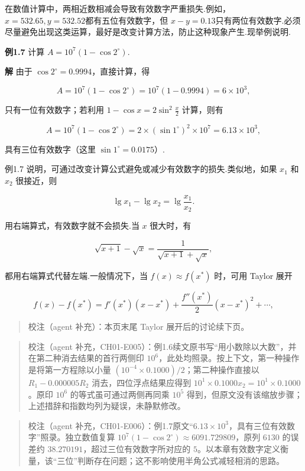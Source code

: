 \documentclass[
  10pt,
  fontset=fandol]{ctexart}
\begin{document}
在数值计算中，两相近数相减会导致有效数字严重损失.例如，\(x=532.65, y=532.52\)都有五位有效数字，但 \(x-y=0.13\)只有两位有效数字.必须尽量避免出现这类运算，最好是改变计算方法，防止这种现象产生.现举例说明.

\textbf{例1.7} 计算 \(A=10^7(1-\cos 2^\circ)\).

\textbf{解} 由于 \(\cos 2^\circ=0.9994\)，直接计算，得

\[
A=10^7(1-\cos 2^\circ)=10^7(1-0.9994)=6 \times 10^3,
\]

只有一位有效数字；若利用 \(1-\cos x=2\sin^2\frac{x}{2}\) 计算，则有

\[
A=10^7(1-\cos 2^\circ)=2 \times (\sin 1^\circ)^2 \times 10^7=6.13 \times 10^3,
\]

具有三位有效数字（这里 \(\sin 1^\circ=0.0175\)）.

例1.7 说明，可通过改变计算公式避免或减少有效数字的损失.类似地，如果 \(x_1\) 和 \(x_2\) 很接近，则

\[
\lg x_1-\lg x_2=\lg \frac{x_1}{x_2}.
\]

用右端算式，有效数字就不会损失.当 \(x\) 很大时，有

\[
\sqrt{x+1}-\sqrt{x}=\frac{1}{\sqrt{x+1}+\sqrt{x}},
\]

都用右端算式代替左端.一般情况下，当 \(f(x)\approx f(x^*)\) 时，可用 Taylor 展开

\[
f(x)-f(x^*)=f'(x^*) (x-x^*)+\frac{f''(x^*)}{2} (x-x^*)^2+\cdots,
\]

\begin{quote}
校注（agent 补充）：本页末尾 Taylor 展开后的讨论续下页。
\end{quote}

\begin{quote}
校注（agent 补充，CH01-E005）：例1.6续文原书写``用小数除以大数''，并在第二种消去结果的首行两侧印 \(10^6\)，此处均照录。按上下文，第一种操作是将第一方程除以小量 \((10^{-4}\times0.1000)/2\)；第二种操作直接以 \(R_1-0.000005R_2\) 消去，四位浮点结果应得到 \(10^1\times0.1000x_2=10^1\times0.1000\)。原印 \(10^6\) 的等式虽可通过两侧再同乘 \(10^5\) 得到，但原文没有该缩放步骤；上述措辞和指数均列为疑误，未静默修改。
\end{quote}

\begin{quote}
校注（agent 补充，CH01-E006）：例1.7原文``\(6.13\times10^3\)，具有三位有效数字''照录。独立数值复算 \(10^7(1-\cos2^\circ)\approx6091.729809\)，原列 \(6130\) 的误差约 \(38.270191\)，超过三位有效数字所对应的 \(5\)。以本章有效数字定义衡量，该``三位''判断存在问题；这不影响使用半角公式减轻相消的思路。
\end{quote}
\end{document}
